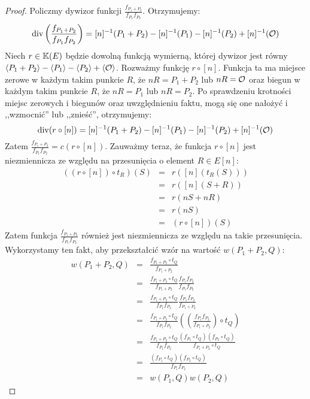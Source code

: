 \begin{proof}
Policzmy dywizor funkcji $\frac{f_{P_1 + P_2}}{f_{P_1}f_{P_2}}$.
Otrzymujemy:
\begin{equation*}
\operatorname{div}\left(\frac{f_{P_1 + P_2}}{f_{P_1}f_{P_2}}\right) =
[n]^{-1}(P_1 + P_2) - [n]^{-1}(P_1) - [n]^{-1}(P_2) + [n]^{-1}(\mathcal{O})
\end{equation*}
Niech $r \in \mathbb{K}(E)$ będzie dowolną funkcją wymierną,
której dywizor jest równy
$\left\langle P_1 + P_2\right\rangle - \left\langle P_1\right\rangle - \left\langle P_2\right\rangle + \left\langle\mathcal{O}\right\rangle$.
Rozważmy funkcję $r \circ [n]$.
Funkcja ta ma miejsce zerowe w każdym takim punkcie $R$,
że $nR = P_1 + P_2$ lub $nR = \mathcal{O}$
oraz biegun w każdym takim punkcie $R$,
że $nR = P_1$ lub $nR = P_2$.
Po sprawdzeniu krotności miejsc zerowych i biegunów
oraz uwzględnieniu faktu,
mogą się one nałożyć i ,,wzmocnić'' lub ,,znieść'',
otrzymujemy:
\begin{equation*}
\operatorname{div}(r \circ [n]) =
[n]^{-1}(P_1 + P_2) - [n]^{-1}(P_1) - [n]^{-1}(P_2) + [n]^{-1}(\mathcal{O})
\end{equation*}
Zatem $\frac{f_{P_1 + P_2}}{f_{P_1}f_{P_2}} = c(r \circ [n])$.
Zauważmy teraz, że funkcja $r \circ [n]$ jest niezmiennicza
ze względu na przesunięcia o element $R \in E[n]$:
\begin{eqnarray*}
((r \circ [n]) \circ t_R)(S)
& = & r([n](t_R(S))) \\
& = & r([n](S + R)) \\
& = & r(nS + nR) \\
& = & r(nS) \\
& = & (r \circ [n])(S)
\end{eqnarray*}
Zatem funkcja $\frac{f_{P_1 + P_2}}{f_{P_1}f_{P_2}}$
również jest niezmiennicza ze względu na takie przesunięcia.
Wykorzystamy ten fakt, aby przekształcić wzór na wartość $w(P_1 + P_2, Q)$:
\begin{eqnarray*}
w(P_1 + P_2, Q)
& = & \frac{f_{P_1 + P_2} \circ t_Q}{f_{P_1 + P_2}} \\
& = & \frac{f_{P_1 + P_2} \circ t_Q}{f_{P_1 + P_2}}
      \frac{f_{P_1}f_{P_2}}{f_{P_1}f_{P_2}} \\
& = & \frac{f_{P_1 + P_2} \circ t_Q}{f_{P_1}f_{P_2}}
      \frac{f_{P_1}f_{P_2}}{f_{P_1 + P_2}} \\
& = & \frac{f_{P_1 + P_2} \circ t_Q}{f_{P_1}f_{P_2}}
      \left(\left(\frac{f_{P_1}f_{P_2}}{f_{P_1 + P_2}}\right) \circ t_Q\right)
      \\
& = & \frac{f_{P_1 + P_2} \circ t_Q}{f_{P_1}f_{P_2}}
      \frac{(f_{P_1} \circ t_Q)(f_{P_2} \circ t_Q)}{f_{P_1 + P_2} \circ t_Q} \\
& = & \frac{(f_{P_1} \circ t_Q)(f_{P_2} \circ t_Q)}{f_{P_1}f_{P_2}} \\
& = & w(P_1, Q)w(P_2, Q)
\end{eqnarray*}
\end{proof}

